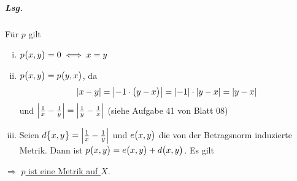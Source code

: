 \documentclass{scrreprt}
\begin{document}
\begin{enumerate}[(a)]
  \subparagraph{Lsg.} Für $p$ gilt
  \begin{enumerate}[(i)]
  \item $p\qty\big(x, y) = 0 \iff x = y$
  \item $p\qty\big(x, y) = p\qty\big(y, x)$, da
    \[
      \abs{x - y} = \abs{-1 \cdot \qty\big(y - x)} =
      \abs{-1} \cdot \abs{y - x} = \abs{y - x}
    \]
    und $\abs{\frac{1}{x} - \frac{1}{y}} = \abs{\frac{1}{y} - \frac{1}{x}}$
    (siehe Aufgabe 41 von Blatt 08)
  \item Seien $d\qty\big{x, y} = \abs{\frac{1}{x} - \frac{1}{y}}$ und
    $e\qty\big(x, y)$ die von der Betragsnorm induzierte Metrik.
    Dann ist $p\qty\big(x, y) = e\qty\big(x, y) + d\qty\big(x, y)$.
    Es gilt
  \end{enumerate}

  $\Rightarrow$ \underline{$p$ ist eine Metrik auf $X$}.
\end{enumerate}
\end{document}
